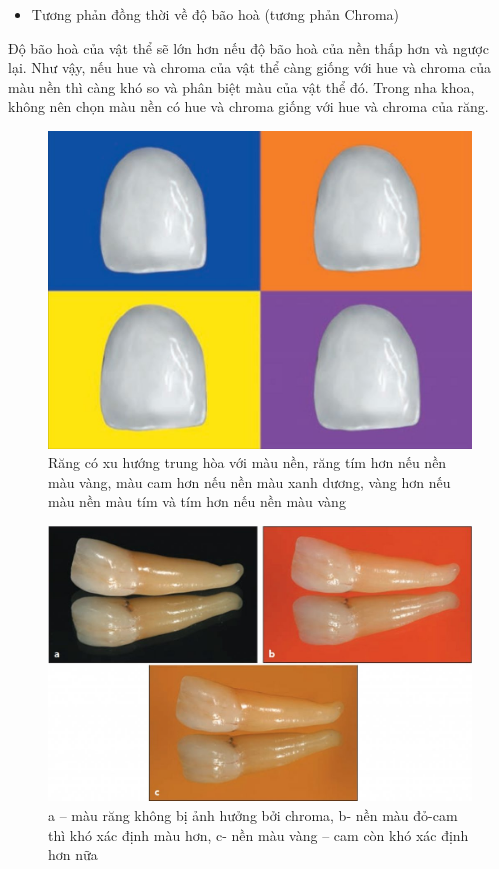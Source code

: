 \begin{itemize}
    \item{Tương phản đồng thời về độ bão hoà (tương phản Chroma)}
\end{itemize}
\vspace{-5pt}
\qquad Độ bão hoà của vật thể sẽ lớn hơn nếu độ bão hoà của nền thấp hơn và ngược lại. Như vậy, nếu hue và chroma của vật thể càng giống với hue và chroma của màu nền thì càng khó so và phân biệt màu của vật thể đó. Trong nha khoa, không nên chọn màu nền có hue và chroma giống với hue và chroma của răng.\cite{TruongDinhKhoi}
\begin{figure}[h!]
  \centering
    \includegraphics[width=0.6\columnwidth]{pictures/hue.jpeg}
    \caption{Răng có xu hướng trung hòa với màu nền, răng tím hơn nếu nền màu vàng, màu cam hơn nếu nền màu xanh dương, vàng hơn nếu màu nền màu tím và tím hơn nếu nền màu vàng}
    \label{fig:hue}
\end{figure}
\begin{figure}[h!]
   \centering
    \includegraphics[width=0.7\columnwidth]{pictures/chroma.jpeg}
    \caption{a – màu răng không bị ảnh hưởng bởi chroma, b- nền màu đỏ-cam thì khó xác định màu hơn, c- nền màu vàng – cam còn khó xác định hơn nữa}
    \label{fig:chroma}
\end{figure}

